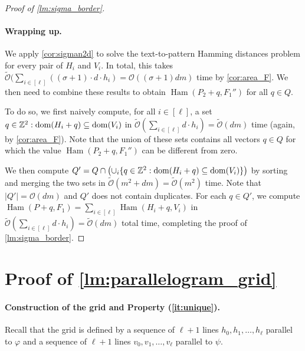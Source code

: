 \documentclass[11pt, letterpaper]{article}
\theoremstyle{plain}
\theoremstyle{definition}
\theoremstyle{remark}
\newcommand{\Z}{\mathbb{Z}}
\renewcommand{\O}{\mathcal{O}}
\newcommand{\tO}{\tilde{\mathcal{O}}}
\renewcommand{\phi}{\varphi}
\DeclareMathOperator*{\Ham}{Ham}
\newcommand{\absolute}[1]{\left\lvert#1\right\rvert}
\begin{document}
\begin{proof}[{Proof of \cref{lm:sigma_border}}]
\paragraph*{Wrapping up.}
We apply \cref{cor:sigman2d} to solve the text-to-pattern Hamming distances problem for every pair of $H_i$ and $V_i$. In total, this takes $\tO(\sum_{i \in [\ell]} ((\sigma+1) \cdot d \cdot h_i) = \O((\sigma+1) dm)$ time by \cref{cor:area_F}. We then need to combine these results to obtain $\Ham(P_2 + q, F_1'')$ for all $q \in Q$. 

To do so, we first naively compute, for all $i \in [\ell]$, a set ${q \in \Z^2 : \d{H_i+q} \subseteq \d{V_i}}$ in $\tO(\sum_{i \in [\ell]} d \cdot h_i) = \tO(dm)$ time (again, by \cref{cor:area_F}). Note that the union of these sets contains all vectors $q \in Q$ for which the value $\Ham(P_2 + q, F_1'')$ can be different from zero. 

We then compute $Q' = Q \cap \bigl( \cup_i \{q \in \Z^2 : \d{H_i+q} \subseteq \d{V_i}\} \bigr)$ by sorting and merging the two sets in $\tO(m^2 + dm) = \tO(m^2)$ time. Note that $\absolute{Q'} = \O(dm)$ and $Q'$ does not contain duplicates. For each $q \in Q'$, we compute $\Ham(P + q, F_1) = \sum_{i \in [\ell]} \Ham(H_i + q, V_i)$ in $\tO(\sum_{i \in [\ell]} d \cdot h_i) = \tO(dm)$ total time, completing the proof of \cref{lm:sigma_border}.
\end{proof}





\appendix
\section{Proof of \cref{lm:parallelogram_grid}}
\label{app:parallelogram_grid}
\paragraph*{Construction of the grid and Property (\ref{it:unique}).}
Recall that the grid is defined by a sequence of $\ell+1$ lines $h_0, h_1, \ldots, h_\ell$ parallel to $\phi$ and a sequence of $\ell+1$ lines $v_0, v_1, \ldots, v_\ell$ parallel to $\psi$. 
\end{document}
